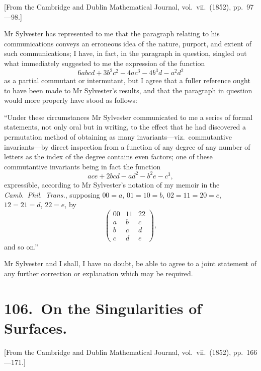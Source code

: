 \documentclass[11pt,a4paper]{article}
\theoremstyle{plain}
\begin{document}
[From the Cambridge and Dublin Mathematical Journal, vol.\ vii.\ (1852), pp.\ 97---98.]

\bigskip

Mr Sylvester has represented to me that the paragraph relating to his communications conveys an erroneous idea of the nature, purport, and extent of such communications; I have, in fact, in the paragraph in question, singled out what immediately suggested to me the expression of the function
\[6abcd + 3b^2c^2 - 4ac^3 - 4b^3d - a^2d^2\]
as a partial commutant or intermutant, but I agree that a fuller reference ought to have been made to Mr Sylvester's results, and that the paragraph in question would more properly have stood as follows:

\medskip
``Under these circumstances Mr Sylvester communicated to me a series of formal statements, not only oral but in writing, to the effect that he had discovered a permutation method of obtaining as many invariants---viz.\ commutantive invariants---by direct inspection from a function of any degree of any number of letters as the index of the degree contains even factors; one of these commutantive invariants being in fact the function
\[ace + 2bcd - ad^2 - b^2e - c^3,\]
expressible, according to Mr Sylvester's notation of my memoir in the \emph{Camb.\ Phil.\ Trans.}, supposing $00=a$, $01=10=b$, $02=11=20=c$, $12=21=d$, $22=e$, by
\[\begin{pmatrix} 00 & 11 & 22 \\ a & b & c \\ b & c & d \\ c & d & e \end{pmatrix},\]
and so on.''

\medskip
Mr Sylvester and I shall, I have no doubt, be able to agree to a joint statement of any further correction or explanation which may be required.
\clearpage


\section*{106.\ On the Singularities of Surfaces.}

[From the Cambridge and Dublin Mathematical Journal, vol.\ vii.\ (1852), pp.\ 166---171.]
\end{document}
